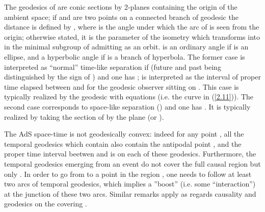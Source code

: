 \documentclass[a4paper,a4paper]{article}
\def\ch{{\rm ch\,}}
\def\wt{\widetilde}
\begin{document}
The geodesics of \coordHE{} are conic sections by 2-planes containing the origin of
the ambient space; if \coordHE{} and \coordHE{} are two points on a connected branch of
geodesic \myHighlight{$\gamma$}\coordHE{} the distance \coordHE{} is defined by \coordHE{}, where \myHighlight{$\theta$}\coordHE{} is the angle under which the arc \coordHE{}
of \myHighlight{$\gamma$}\coordHE{} is seen from the origin; otherwise stated, it is the parameter of
the isometry which transforms \coordHE{} into \coordHE{} in the minimal subgroup of \coordHE{}
admitting \myHighlight{$\gamma$}\coordHE{} as an orbit. \myHighlight{$\theta$}\coordHE{} is an ordinary angle if \myHighlight{$\gamma$}\coordHE{} is
an ellipse, and a hyperbolic angle if \myHighlight{$\gamma$}\coordHE{} is a branch of hyperbola. The
former case is interpreted as ``normal'' time-like separation if \myHighlight{$|\theta| \le
\pi $}\coordHE{} (future and past being distinguished by the sign of \myHighlight{$\theta$}\coordHE{}) and one
has \coordHE{}; \coordHE{} is interpreted as the
interval of proper time elapsed between \coordHE{} and \coordHE{} for the geodesic
observer sitting on \myHighlight{$\gamma$}\coordHE{}. This case is typically realized by the
geodesic with equations \coordHE{}
(i.e. the curve \coordHE{} in (\ref{2.11})).
The second case corresponds to space-like
separation (\coordHE{}) and one has
\myHighlight{$(x_1,x_2) =  \ch {d(x_1,x_2)} > 1 $}\coordHE{}.
It is typically realized by taking
the section of \coordHE{} by the plane \coordHE{}
(or \coordHE{}).

The AdS space-time is not geodesically convex: indeed for any
point \coordHE{}, all the temporal geodesics which contain \coordHE{} also
contain the antipodal point \coordHE{}, and the proper time interval
beetwen \coordHE{} and \coordHE{} is \myHighlight{$\pi $}\coordHE{} on each of these geodesics.
Furthermore, the temporal geodesics emerging from an event \coordHE{} do
not cover the full causal region \coordHE{} but only
\coordHE{}. In order to go from \coordHE{} to a
point \coordHE{} in the region \coordHE{}, one needs to follow at
least two arcs of temporal geodesics, which implies a ''boost''
(i.e. some ``interaction'') at the junction of these two arcs.
Similar remarks apply as regards causality and geodesics on the
covering \myHighlight{$\wt X_d$}\coordHE{}.
\end{document}
